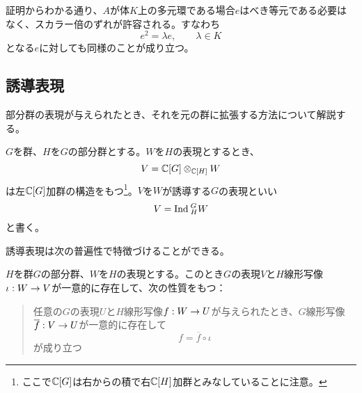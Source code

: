 \documentclass{ltjsarticle}
\begin{document}
\begin{notice}
  証明からわかる通り、$A$が体$K$上の多元環である場合$e$はべき等元である必要はなく、スカラー倍のずれが許容される。すなわち
  \[
  e^2=\lambda e,\qquad \lambda\in K
  \]
  となる$e$に対しても同様のことが成り立つ。
\end{notice}




\subsection{誘導表現}

部分群の表現が与えられたとき、それを元の群に拡張する方法について解説する。

\begin{defin}\label{ind_rep}
  $G$を群、$H$を$G$の部分群とする。$W$を$H$の表現とするとき、
  \[
  V=\mathbb{C}[G]\otimes_{\mathbb{C}[H]}W 
  \]
  は左$\mathbb{C}[G]$加群の構造をもつ\footnote{
    ここで$\mathbb{C}[G]$は右からの積で右$\mathbb{C}[H]$加群とみなしていることに注意。}。$V$を$W$が誘導する$G$の表現といい
  \[
  V=\text{Ind}\:_H^GW  
  \]
  と書く。
\end{defin}

誘導表現は次の普遍性で特徴づけることができる。

\begin{theo}[誘導表現の普遍性]\label{univ_ind_rep}
  $H$を群$G$の部分群、$W$を$H$の表現とする。このとき$G$の表現$V$と$H$線形写像$\iota:W\rightarrow V$が一意的に存在して、次の性質をもつ：
  \begin{quote}
    任意の$G$の表現$U$と$H$線形写像$f:W\rightarrow U$が与えられたとき、$G$線形写像$\overline{f}:V\rightarrow U$が一意的に存在して
    \[
    f=\overline{f}\circ\iota  
    \]
    が成り立つ
  \end{quote}
\end{theo}
\end{document}
